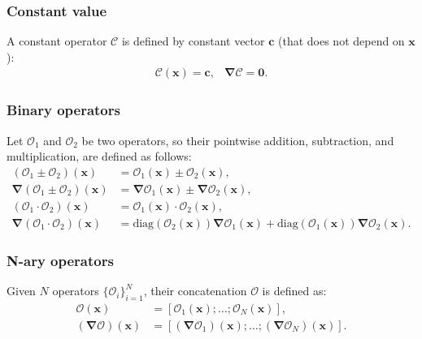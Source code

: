 \documentclass[MSc,beforeExam]{iitcsthesis}
\newcommand{\diag}{\ensuremath{\mathrm{diag}}}
\newcommand\bnabla{\boldsymbol{\nabla}}
\newcommand\bx{\boldsymbol{x}}
\newcommand\bc{\boldsymbol{c}}
\newcommand\bzero{\boldsymbol{0}}
\newcommand\cO{\mathcal{O}}
\begin{document}
\subsubsection{Constant value}
A constant operator $\mathcal{C}$ is defined by constant vector $\bc$ 
(that does not depend on $\bx$):
\begin{equation}\begin{array}{cc}
\mathcal{C}(\bx) = \bc, &
\bnabla\mathcal{C} = \bzero.
\end{array}\end{equation}

\subsubsection{Binary operators}
Let $\cO_1$ and $\cO_2$ be two operators, so their pointwise addition, subtraction,
and multiplication, are defined as follows:
\begin{align}
(\cO_1 \pm \cO_2)(\bx) &= \cO_1(\bx) \pm \cO_2(\bx), \\
\nonumber
\bnabla (\cO_1 \pm \cO_2)(\bx) &= \bnabla\cO_1(\bx) \pm \bnabla\cO_2(\bx), \\
(\cO_1 \cdot \cO_2)(\bx) &= \cO_1(\bx) \cdot \cO_2(\bx), \\
\nonumber
\bnabla (\cO_1 \cdot \cO_2)(\bx) &= \diag(\cO_2(\bx)) \bnabla\cO_1(\bx) 
                                  + \diag(\cO_1(\bx)) \bnabla\cO_2(\bx).
\end{align}
\subsubsection{N-ary operators}
Given $N$ operators $\{\cO_i\}_{i=1}^N$, their concatenation $\cO$ is defined as:
\begin{align}
\cO(\bx) &= [\cO_1(\bx); \ldots; \cO_N(\bx)], \\
\nonumber
(\bnabla\cO)(\bx) &= [(\bnabla\cO_1)(\bx); \ldots; (\bnabla\cO_N)(\bx)].
\end{align}
\end{document}
